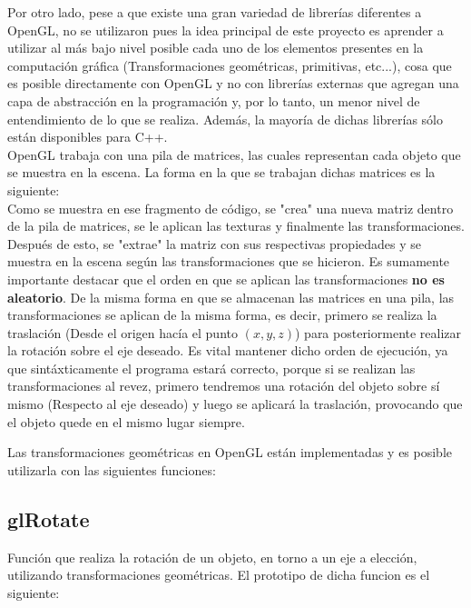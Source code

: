 \documentclass[journal]{IEEEtran}
\begin{document}
Por otro lado, pese a que existe una gran variedad de librerías diferentes a OpenGL, no se utilizaron pues la idea principal de este proyecto es aprender a utilizar al más bajo nivel posible cada uno de los elementos presentes en la computación gráfica (Transformaciones geométricas, primitivas, etc...), cosa que es posible directamente con OpenGL y no con librerías externas que agregan una capa de abstracción en la programación y, por lo tanto, un menor nivel de entendimiento de lo que se realiza. Además, la mayoría de dichas librerías sólo están disponibles para C++.\\

OpenGL trabaja con una pila de matrices, las cuales representan cada objeto que se muestra en la escena. La forma en la que se trabajan dichas matrices es la siguiente:\\

  

Como se muestra en ese fragmento de código, se "crea" una nueva matriz dentro de la pila de matrices, se le aplican las texturas y finalmente las transformaciones. Después de esto, se "extrae" la matriz con sus respectivas propiedades y se muestra en la escena según las transformaciones que se hicieron. Es sumamente importante destacar que el orden en que se aplican las transformaciones \textbf{no es aleatorio}. De la misma forma en que se almacenan las matrices en una pila, las transformaciones se aplican de la misma forma, es decir, primero se realiza la traslación (Desde el origen hacía el punto $(x,y,z)$) para posteriormente realizar la rotación sobre el eje deseado. Es vital mantener dicho orden de ejecución, ya que sintáxticamente el programa estará correcto, porque si se realizan las transformaciones al revez, primero tendremos una rotación del objeto sobre sí mismo (Respecto al eje deseado) y luego se aplicará la traslación, provocando que el objeto quede en el mismo lugar siempre.

Las transformaciones geométricas en OpenGL están implementadas y es posible utilizarla con las siguientes funciones:

\subsection{glRotate}

Función que realiza la rotación de un objeto, en torno a un eje a elección, utilizando transformaciones geométricas\cite{glrotate}. El prototipo de dicha funcion es el siguiente:
\end{document}
